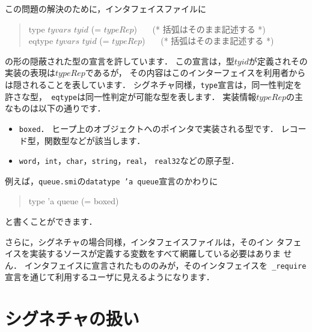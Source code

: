 \documentclass{jbook}
\newenvironment{program}{\begin{tt}\begin{quote}}{\end{quote}\end{tt}}
\begin{document}
	この問題の解決のために，インタフェイスファイルに
\begin{program}
type $tyvars$ $tyid$ (= $typeRep$) \ \ \ (* 括弧はそのまま記述する *)\\
eqtype $tyvars$ $tyid$ (= $typeRep$) \ \ \ (* 括弧はそのまま記述する *)
\end{program}
の形の隠蔽された型の宣言を許しています．
	この宣言は，型$tyid$が定義されその実装の表現は$typeRep$であるが，
その内容はこのインターフェイスを利用者からは隠されることを表しています．
	シグネチャ同様，{\tt type}宣言は，同一性判定を許さな型，{\tt
eqtype}は同一性判定が可能な型を表します．
	実装情報$typeRep$の主なものは以下の通りです．
\begin{itemize}
\item {\tt boxed}．
	ヒープ上のオブジェクトへのポインタで実装される型です．
	レコード型，関数型などが該当します．
\item {\tt word}，{\tt int}，{\tt char}，{\tt string}，{\tt real}，
{\tt real32}などの原子型．
\end{itemize}
	例えば，{\tt queue.smi}の{\tt datatype 'a queue}宣言のかわりに
\begin{program}
type 'a queue (= boxed)
\end{program}
と書くことができます．

	さらに，シグネチャの場合同様，インタフェイスファイルは，そのイン
タフェイスを実装するソースが定義する変数をすべて網羅している必要はありま
せん．
	インタフェイスに宣言されたもののみが，そのインタフェイスを{\tt
\_require}宣言を通じて利用するユーザに見えるようになります．

\section{シグネチャの扱い}
\label{sec:tutorialSignatureInInterface}
\end{document}
